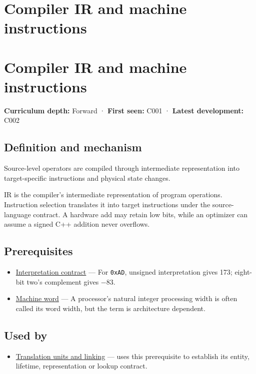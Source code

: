 \hypertarget{appendix-942ad41afb30}{}
\section*{Compiler IR and machine instructions}
\section{Compiler IR and machine instructions}\label{compiler-ir-and-machine-instructions}

\textbf{Curriculum depth:} Forward · \textbf{First seen:} C001 · \textbf{Latest development:} C002

\subsection{Definition and mechanism}\label{definition-and-mechanism}

Source-level operators are compiled through intermediate representation into target-specific instructions and physical state changes.

IR is the compiler's intermediate representation of program operations. Instruction selection translates it into target instructions under the source-language contract. A hardware add may retain low bits, while an optimizer can assume a signed C++ addition never overflows.

\subsection{Prerequisites}\label{prerequisites}

\begin{itemize}
\tightlist
\item
  \hyperref[appendix-f414bd4ed05c]{Interpretation contract} --- For \texttt{0xAD}, unsigned interpretation gives 173; eight-bit two's complement gives −83.
\item
  \hyperref[appendix-d67a19507dc5]{Machine word} --- A processor's natural integer processing width is often called its word width, but the term is architecture dependent.
\end{itemize}

\subsection{Used by}\label{used-by}

\begin{itemize}
\tightlist
\item
  \hyperref[appendix-806686359e1b]{Translation units and linking} --- uses this prerequisite to establish its entity, lifetime, representation or lookup contract.
\end{itemize}


